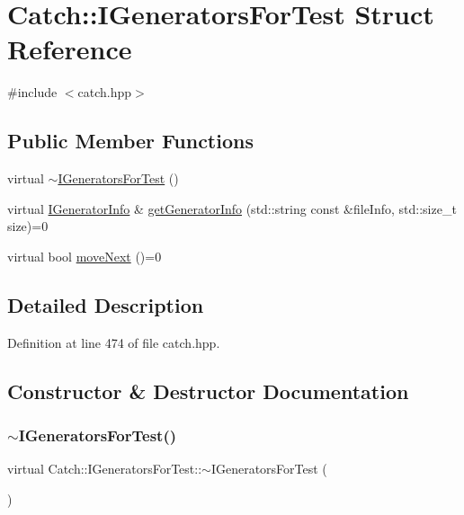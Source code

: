 \hypertarget{struct_catch_1_1_i_generators_for_test}{}\section{Catch\+:\+:I\+Generators\+For\+Test Struct Reference}
\label{struct_catch_1_1_i_generators_for_test}


{\ttfamily \#include $<$catch.\+hpp$>$}

\subsection*{Public Member Functions}
\begin{DoxyCompactItemize}
\item 
virtual \hyperlink{struct_catch_1_1_i_generators_for_test_a05725e76ee92e498f73479a61f3e3c7c}{$\sim$\+I\+Generators\+For\+Test} ()
\item 
virtual \hyperlink{struct_catch_1_1_i_generator_info}{I\+Generator\+Info} \& \hyperlink{struct_catch_1_1_i_generators_for_test_a180d84e858840188e4c3788e47eefdb0}{get\+Generator\+Info} (std\+::string const \&file\+Info, std\+::size\+\_\+t size)=0
\item 
virtual bool \hyperlink{struct_catch_1_1_i_generators_for_test_adab31832d529fc584fd63164e0a1c8ad}{move\+Next} ()=0
\end{DoxyCompactItemize}


\subsection{Detailed Description}


Definition at line 474 of file catch.\+hpp.



\subsection{Constructor \& Destructor Documentation}
\hypertarget{struct_catch_1_1_i_generators_for_test_a05725e76ee92e498f73479a61f3e3c7c}{}\label{struct_catch_1_1_i_generators_for_test_a05725e76ee92e498f73479a61f3e3c7c} 
\subsubsection{\texorpdfstring{$\sim$\+I\+Generators\+For\+Test()}{~IGeneratorsForTest()}}
{\footnotesize\ttfamily virtual Catch\+::\+I\+Generators\+For\+Test\+::$\sim$\+I\+Generators\+For\+Test (\begin{DoxyParamCaption}{ }\end{DoxyParamCaption})\hspace{0.3cm}{\ttfamily [virtual]}}



